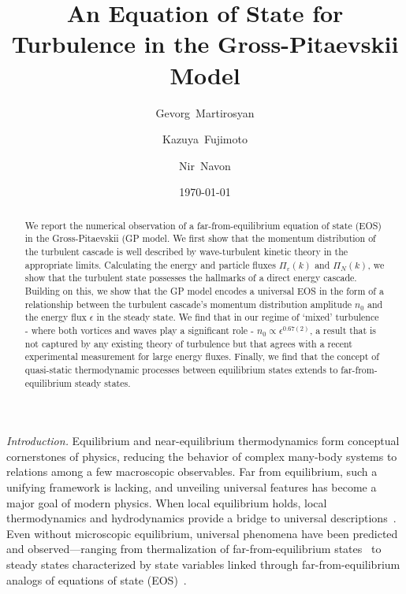 \documentclass[prl,aps,twocolumn, a4paper,longbibliography,superscriptaddress]{revtex4-2}
\date{\today}
\begin{document}
\title{
An Equation of State for Turbulence in the Gross-Pitaevskii Model
}

\author{Gevorg~Martirosyan}
\author{Kazuya~Fujimoto}
\author{Nir~Navon}


\begin{abstract}

{We report the numerical observation of a far-from-equilibrium equation of state (EOS) in the Gross-Pitaevskii (GP model. We first show that the momentum distribution of the turbulent cascade is well described by wave-turbulent kinetic theory in the appropriate limits. Calculating the energy and particle fluxes $\Pi_\varepsilon(k)$ and $\Pi_N(k)$, we show that the turbulent state possesses the hallmarks of a direct energy cascade. Building on this, we show that the GP model encodes a universal EOS in the form of a relationship between the turbulent cascade's momentum distribution amplitude $n_0$ and the energy flux $\epsilon$ in the steady state. We find that in our regime of `mixed' turbulence - where both vortices and waves play a significant role - $n_0\propto \epsilon^{0.67(2)}$, a result that is not captured by any existing theory of turbulence but that agrees with a recent experimental measurement for large energy fluxes.
Finally, we find that the concept of quasi-static thermodynamic processes between equilibrium states extends to far-from-equilibrium steady states.
}

\end{abstract}
\maketitle

{\textit{Introduction.}} Equilibrium and near-equilibrium thermodynamics form conceptual cornerstones of physics, reducing the behavior of complex many-body systems to relations among a few macroscopic observables.
Far from equilibrium, such a unifying framework is lacking, and unveiling universal features has become a major goal of modern physics.
When local equilibrium holds, local thermodynamics and hydrodynamics provide a bridge to universal descriptions~\cite{Hohenberg:1977,Bray:2002,forster2018hydrodynamic}.
Even without microscopic equilibrium, universal phenomena have been predicted and observed—ranging from thermalization of far-from-equilibrium states~\cite{Berges:2008,Erne:2018,Pruefer:2018,Glidden:2021,Huh:2024,Moreno:2025,Gazo:2025,Martirosyan:2025} to steady states characterized by state variables linked through far-from-equilibrium analogs of equations of state (EOS)~\cite{Takatori:2015,Ginot:2015,Dogra:2023}.
\end{document}
